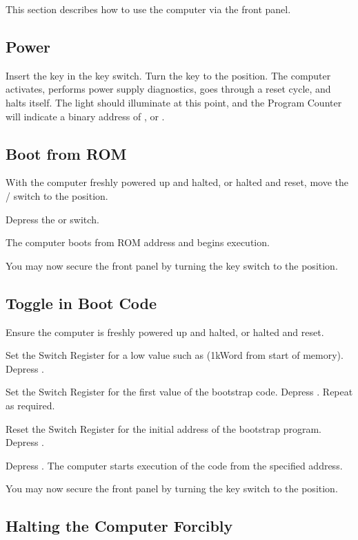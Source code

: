 This section describes how to use the computer via the front panel.

\subsection{Power}

Insert the key in the key switch. Turn the key to the 
position. The computer activates, performs power supply diagnostics,
goes through a reset cycle, and halts itself. The  light
should illuminate at this point, and the Program Counter will indicate
a binary address of , or .

\subsection{Boot from ROM}

With the computer freshly powered up and halted, or halted and reset,
move the / switch to the 
position.

Depress the  or  switch.

The computer boots from ROM address  and begins execution.

You may now secure the front panel by turning the key switch to the
 position.

\subsection{Toggle in Boot Code}

Ensure the computer is freshly powered up and halted, or halted and reset.

Set the Switch Register for a low value such as 
(1kWord from start of memory). Depress .

Set the Switch Register for the first value of the bootstrap
code. Depress . Repeat as required.

Reset the Switch Register for the initial address of the bootstrap
program. Depress .

Depress . The computer starts execution of the code from the
specified address.

You may now secure the front panel by turning the key switch to the
 position.

\subsection{Halting the Computer Forcibly}

